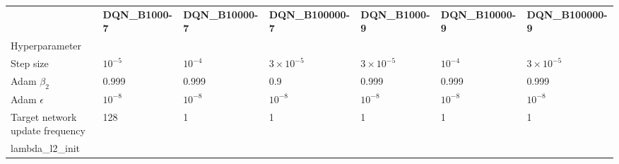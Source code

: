 \begin{tabular}{lllllll}
 & \bfseries DQN_B1000-7 & \bfseries DQN_B10000-7 & \bfseries DQN_B100000-7 & \bfseries DQN_B1000-9 & \bfseries DQN_B10000-9 & \bfseries DQN_B100000-9 \\
Hyperparameter &  &  &  &  &  &  \\
Step size & $10^{-5}$ & $10^{-4}$ & $3 \times 10^{-5}$ & $3 \times 10^{-5}$ & $10^{-4}$ & $3 \times 10^{-5}$ \\
Adam $\beta_2$ & 0.999 & 0.999 & 0.9 & 0.999 & 0.999 & 0.999 \\
Adam $\epsilon$ & $10^{-8}$ & $10^{-8}$ & $10^{-8}$ & $10^{-8}$ & $10^{-8}$ & $10^{-8}$ \\
Target network update frequency & 128 & 1 & 1 & 1 & 1 & 1 \\
lambda_l2_init &  &  &  &  &  &  \\
\end{tabular}
